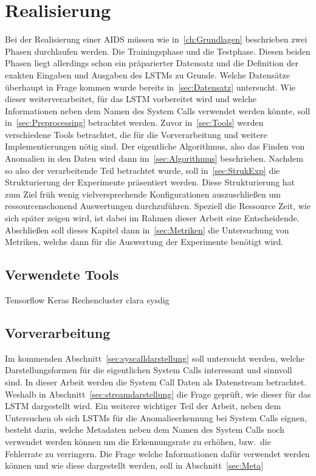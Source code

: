 
\chapter{Realisierung}\label{ch:Realisierung}
    Bei der Realisierung einer AIDS müssen wie in~\autoref{ch:Grundlagen} beschrieben zwei Phasen durchlaufen werden.
    Die Trainingsphase und die Testphase.
    Diesen beiden Phasen liegt allerdings schon ein präparierter Datensatz und die Definition der exakten Eingaben und Ausgaben des LSTMs zu Grunde. 
    Welche Datensätze überhaupt in Frage kommen wurde bereits in~\autoref{sec:Datensatz} untersucht.
    Wie dieser weiterverarbeitet, für das LSTM vorbereitet wird und welche Informationen neben dem Namen des System Calls verwendet werden könnte, 
    soll in~\autoref{sec:Preprocessing} betrachtet werden.
    Zuvor in~\autoref{sec:Tools} werden verschiedene Tools betrachtet, die für die Vorverarbeitung und weitere Implementierungen nötig sind.
    Der eigentliche Algorithmus, also das Finden von Anomalien in den Daten wird dann im~\autoref{sec:Algorithmus} beschrieben.
    Nachdem so also der verarbeitende Teil betrachtet wurde, soll in~\autoref{sec:StrukExp} die Strukturierung der Experimente präsentiert werden.
    Diese Strukturierung hat zum Ziel früh wenig vielversprechende Konfigurationen auszuschließen um ressourcenschonend Auswertungen durchzuführen.
    Speziell die Ressource Zeit, wie sich später zeigen wird, ist dabei im Rahmen dieser Arbeit eine Entscheidende.
    Abschließen soll dieses Kapitel dann in~\autoref{sec:Metriken} die Untersuchung von Metriken, welche dann für die Auswertung der Experimente benötigt wird.



    \section{Verwendete Tools}\label{sec:Tools}
        Tensorflow Keras
        Rechencluster clara
        sysdig

    \section{Vorverarbeitung}\label{sec:Preprocessing}
        Im kommenden Abschnitt~\ref{sec:syscalldarstellung} soll untersucht werden, welche Darstellungsformen für die eigentlichen System Calls interessant und sinnvoll sind.
        In dieser Arbeit werden die System Call Daten als Datenstream betrachtet.
        Weshalb in Abschnitt~\ref{sec:streamdarstellung} die Frage geprüft, wie dieser für das LSTM dargestellt wird.
        Ein weiterer wichtiger Teil der Arbeit, neben dem Untersuchen ob sich LSTMs für die Anomalieerkennung bei System Calls eignen, besteht darin,
        welche Metadaten neben dem Namen des System Calls noch verwendet werden können um die Erkennungsrate zu erhöhen, bzw.\ die Fehlerrate zu verringern.
        Die Frage welche Informationen dafür verwendet werden können und wie diese dargestellt werden, soll in Abschnitt~\ref{sec:Meta}

